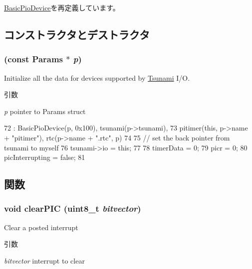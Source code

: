 \hyperlink{classBasicPioDevice_a2845515ac6467f10540747053c8a0449}{BasicPioDevice}を再定義しています。

\subsection{コンストラクタとデストラクタ}
\hypertarget{classTsunamiIO_a8efaf6e7ccc23f00c50f96eb2cefc742}{
\subsubsection[{TsunamiIO}]{ (const {\bf Params} $\ast$ {\em p})}}
\label{classTsunamiIO_a8efaf6e7ccc23f00c50f96eb2cefc742}
Initialize all the data for devices supported by \hyperlink{classTsunami}{Tsunami} I/O. 
\begin{DoxyParams}{引数}
\item[{\em p}]pointer to Params struct \end{DoxyParams}



\begin{DoxyCode}
72     : BasicPioDevice(p, 0x100), tsunami(p->tsunami),
73       pitimer(this, p->name + "pitimer"), rtc(p->name + ".rtc", p)
74 {
75     // set the back pointer from tsunami to myself
76     tsunami->io = this;
77 
78     timerData = 0;
79     picr = 0;
80     picInterrupting = false;
81 }
\end{DoxyCode}


\subsection{関数}
\hypertarget{classTsunamiIO_ac1aa8cd6747e47946be3f85d914a6e69}{
\subsubsection[{clearPIC}]{\setlength{\rightskip}{0pt plus 5cm}void clearPIC (uint8\_\-t {\em bitvector})}}
\label{classTsunamiIO_ac1aa8cd6747e47946be3f85d914a6e69}
Clear a posted interrupt 
\begin{DoxyParams}{引数}
\item[{\em bitvector}]interrupt to clear \end{DoxyParams}



